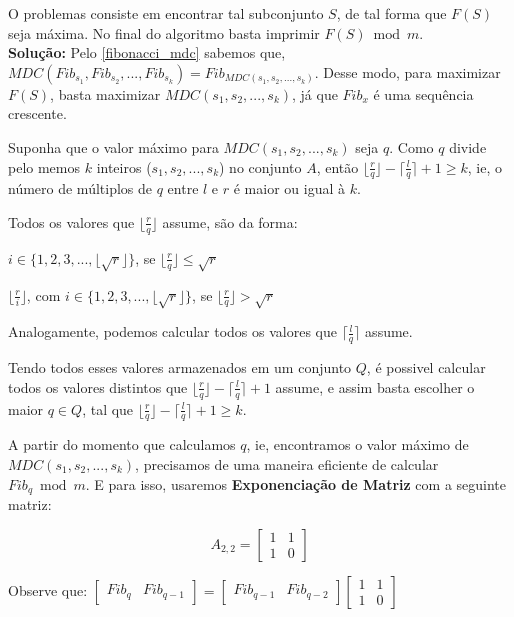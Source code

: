 O problemas consiste em encontrar tal subconjunto $S$, de tal forma que $F(S)$ seja máxima. No final do algoritmo basta imprimir 
$F(S) \bmod m$.
\\

\textbf{Solução:}
Pelo \autoref{fibonacci_mdc} sabemos que, $MDC(Fib_{s_1}, Fib_{s_2}, ..., Fib_{s_k}) = Fib_{MDC(s_1,s_2,...,s_k)}$.
Desse modo, para maximizar $F(S)$, basta maximizar $MDC(s_1,s_2,...,s_k)$, já que $Fib_x$ é uma sequência crescente.

Suponha que o valor máximo para $MDC(s_1,s_2,...,s_k)$ seja $q$. Como $q$ divide pelo memos $k$ inteiros ($s_1,s_2,...,s_k$)
no conjunto $A$, então $\lfloor \frac{r}{q} \rfloor -\lceil \frac{l}{q} \rceil + 1 \geq k$, ie, o número de múltiplos de $q$ entre $l$ e $r$ é maior ou igual à $k$.

Todos os valores que $\lfloor \frac{r}{q} \rfloor$ assume, são da forma:
\newline

$i \in \{1,2,3,...,\lfloor\sqrt{r}\rfloor\}$, se $\lfloor \frac{r}{q} \rfloor \leq \sqrt{r}$

$\lfloor \frac{r}{i} \rfloor$, com $i \in \{1,2,3,...,\lfloor\sqrt{r}\rfloor\}$, se $\lfloor \frac{r}{q} \rfloor > \sqrt{r}$
\newline

Analogamente, podemos calcular todos os valores que $\lceil \frac{l}{q} \rceil$ assume.

Tendo todos esses valores armazenados em um conjunto $Q$, é possivel calcular todos os valores distintos que $\lfloor \frac{r}{q} \rfloor -\lceil \frac{l}{q} \rceil + 1$ assume, e assim basta escolher o maior $q \in Q$, tal que 
$\lfloor \frac{r}{q} \rfloor -\lceil \frac{l}{q} \rceil + 1 \geq k$.  

A partir do momento que calculamos $q$, ie, encontramos o valor máximo de $MDC(s_1,s_2,...,s_k)$, precisamos de uma maneira eficiente de calcular $Fib_q \bmod m$.
E para isso, usaremos \textbf{Exponenciação de Matriz} com a seguinte matriz:
\newline

\[ A_{2,2} =
\begin{bmatrix}
       1 & 1           \\[0.3em]
       1 & 0
\end{bmatrix}
\]
\newline

Observe que:
$
\begin{bmatrix}
       Fib_q & Fib_{q-1}
\end{bmatrix}
=
\begin{bmatrix}
       Fib_{q-1} & Fib_{q-2}
\end{bmatrix}
\begin{bmatrix}
       1 & 1           \\[0.3em]
       1 & 0
\end{bmatrix}
$
\newline


